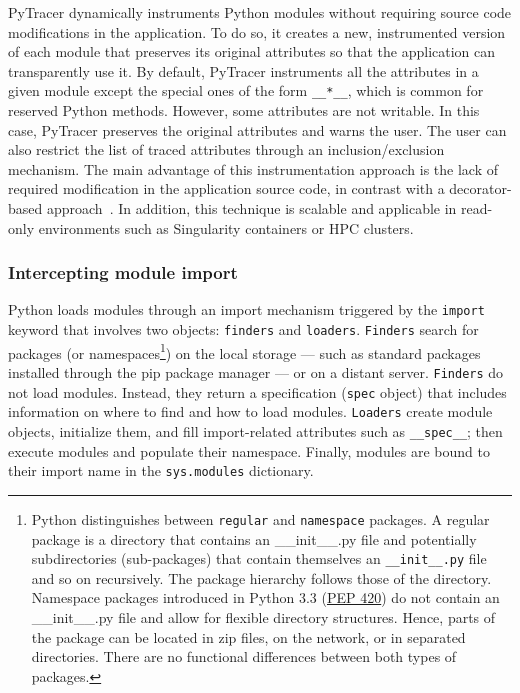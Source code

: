 \documentclass[10pt,journal,compsoc]{IEEEtran}
\newcommand{\pytracer}[0]{PyTracer\xspace}
\begin{document}
\pytracer dynamically instruments Python modules without requiring source code
modifications in the application. To do so, it creates a new, instrumented
version of each module that preserves its original attributes so that the
application can transparently use it.
By default, \pytracer instruments all the attributes in a given module except
the special ones of the form \texttt{\_\_*\_\_}, which is common for reserved
Python methods. However, some attributes are not writable. In this case,
\pytracer preserves the original attributes and warns the user. The user can
also restrict the list of traced attributes through an inclusion/exclusion
mechanism. The main advantage of this instrumentation approach is the lack of
required modification in the application source code, in contrast with  a
decorator-based approach~\mbox{\cite{hunt2019decorators}}. In addition, this
technique is scalable and applicable in read-only environments such as
Singularity containers or HPC clusters.

\subsubsection{Intercepting module import}

Python loads modules through an import mechanism triggered by the
\texttt{import} keyword that involves two objects: \texttt{finders} and
\texttt{loaders}. \texttt{Finders} search for packages (or
namespaces\footnote{Python distinguishes between \texttt{regular} and
    \texttt{namespace} packages. A regular package is a directory that contains an
    \_\_init\_\_.py file and potentially subdirectories (sub-packages) that contain
    themselves an \texttt{\_\_init\_\_.py} file and so on recursively. The package
    hierarchy follows those of the directory. Namespace packages introduced in
    Python 3.3 (\href{https://www.python.org/dev/peps/pep-0420/}{PEP 420}) do not
    contain an \_\_init\_\_.py file and allow for flexible directory structures.
    Hence, parts of the package can be located in zip files, on the network, or in
    separated directories. There are no functional differences between both types of
    packages.}) on the local storage --- such as standard packages installed through
the pip package manager --- or on a distant server. \texttt{Finders} do not load
modules. Instead, they return a specification (\texttt{spec} object) that
includes information on where to find and how to load modules. \texttt{Loaders}
create module objects, initialize them, and fill import-related attributes such
as \texttt{\_\_spec\_\_}; then execute modules and populate their namespace.
Finally, modules are bound to their import name in the \texttt{sys.modules}
dictionary.
\end{document}
